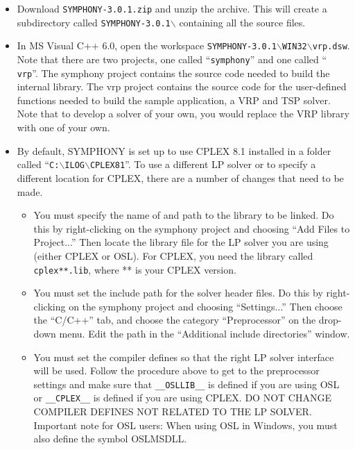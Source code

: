 \begin{itemize}

\item Download {\tt SYMPHONY-3.0.1.zip} and unzip the archive. This will
create a subdirectory called {\tt SYMPHONY-3.0.1$\backslash$} containing all 
the source files.

\item In MS Visual C++ 6.0, open the workspace 
{\tt SYMPHONY-3.0.1$\backslash$WIN32$\backslash$vrp.dsw}.  Note that
there are two projects, one called ``{\tt symphony}'' and one called ``{\tt
vrp}''.  The symphony project contains the source code needed to build the
internal library. The vrp project contains the source code for the
user-defined functions needed to build the sample application, a VRP and TSP
solver. Note that to develop a solver of your own, you would replace the VRP
library with one of your own.

\item By default, SYMPHONY is set up to use CPLEX 8.1 installed in a folder
called ``{\tt C:$\backslash$ILOG$\backslash$CPLEX81}''. To use a different LP 
solver or to specify a different location for CPLEX, there are a number of 
changes that need to be made.

\begin{itemize}

\item You must specify the name of and path to the library to be linked. Do 
this by right-clicking on the symphony project and choosing ``Add Files to
Project...'' Then locate the library file for the LP solver you are using
(either CPLEX or OSL). For CPLEX, you need the library called {\tt
cplex**.lib}, where ** is your CPLEX version.

\item You must set the include path for the solver header files. Do this
by right-clicking on the symphony project and choosing ``Settings...'' Then
choose the ``C/C++'' tab, and choose the category ``Preprocessor'' on the
drop-down menu.  Edit the path in the ``Additional include directories'' 
window.

\item You must set the compiler defines so that the right LP solver interface
will be used. Follow the procedure above to get to the preprocessor settings
and make sure that {\tt \_\_OSLLIB\_\_} is defined if you are using OSL or
{\tt \_\_CPLEX\_\_} is defined if you are using CPLEX. DO NOT CHANGE COMPILER
DEFINES NOT RELATED TO THE LP SOLVER. Important note for OSL users: When using
OSL in Windows, you must also define the symbol OSLMSDLL.


\end{itemize}
\end{itemize}
